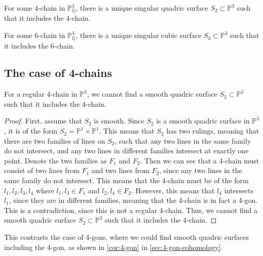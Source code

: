 \begin{lemma}\label{lem:m2_4chain}
    For some 4-chain in $\mathbb{P}_\mathbb{Q}^3$, there is a unique singular quadric surface $ S_2 \subset \mathbb{P}^3$ such that it includes the 4-chain. 
\end{lemma}

\begin{lemma}\label{lem:m2_6chain}
    For some 6-chain in $\mathbb{P}_\mathbb{Q}^3$, there is a unique singular cubic surface $ S_3 \subset \mathbb{P}^3$ such that it includes the 6-chain.
\end{lemma}


\subsection{The case of 4-chains}

\begin{proposition}
    For a regular 4-chain in $\mathbb{P}^3$, we cannot find a smooth quadric surface $ S_2 \subset \mathbb{P}^3$ such that it includes the 4-chain.
\end{proposition}

\begin{proof}
    First, assume that $S_2$ is smooth. Since $S_2$ is a smooth quadric surface in $\mathbb{P}^3$, it is of the form $S_2 = \mathbb{P}^1 \times \mathbb{P}^1$. This means that $S_2$ has two rulings, meaning that there are two families of lines on $S_2$, such that any two lines in the same family do not intersect, and any two lines in different families intersect at exactly one point. Denote the two families as $F_1$ and $F_2$. Then we can see that a 4-chain must consist of two lines from $F_1$ and two lines from $F_2$, since any two lines in the same family do not intersect. This means that the 4-chain must be of the form $l_1, l_2, l_3, l_4$ where $l_1, l_3 \in F_1$ and $l_2, l_4 \in F_2$. However, this means that $l_4$ intersects $l_1$, since they are in different families, meaning that the 4-chain is in fact a 4-gon. This is a contradiction, since this is not a regular 4-chain. Thus, we cannot find a smooth quadric surface $ S_2 \subset \mathbb{P}^3$ such that it includes the 4-chain.
\end{proof}

This contrasts the case of 4-gons, where we could find smooth quadric surfaces including the 4-gon, as shown in \cref{cor:4-gon} in \cref{sec:4-gon-cohomology}.

